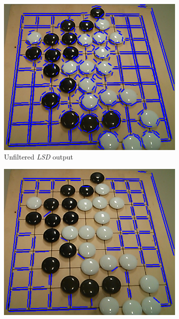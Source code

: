 	\begin{figure}
	\begin{center}
		\begin{subfigure}{0.33\textwidth}
			\includegraphics[width=\textwidth]{images/lsd_first.png}
			\caption{Unfiltered \emph{LSD} output}
			\label{fig:lsdPostprocessingFirst}
		\end{subfigure}
		\hspace{2em}
		\begin{subfigure}{0.33\textwidth}
			\includegraphics[width=\textwidth]{images/lsd_length.png}

\end{subfigure}
\end{center}
\end{figure}

